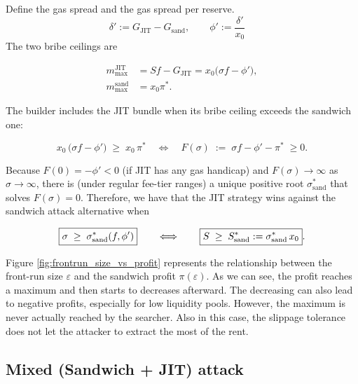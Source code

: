 \documentclass[a4paper,11pt]{article}
\begin{document}

Define the gas spread and the gas spread per reserve.
\begin{equation}
\delta' := G_{\text{JIT}}-G_{\text{sand}},\qquad
\phi'   := \frac{\delta'}{x_{0}}\quad
\end{equation}
The two bribe ceilings are

\[
\begin{aligned}
m_{\max}^{\text{JIT}} 
   &= S f - G_{\text{JIT}} 
   = x_{0} \bigl(\sigma f - \phi' \bigr), \\
m_{\max}^{\text{sand}} 
   &= x_{0} \pi^*.
\end{aligned}
\]

The builder includes the JIT bundle when its
bribe ceiling exceeds the sandwich one:

\begin{equation}
x_{0}\,\bigl(\sigma f - \phi'\bigr)
   \;\ge\;
x_{0}\,\pi^*
\quad\Longleftrightarrow\quad
F(\sigma)\;:=\;
\sigma f - \phi' - \pi^*\;\ge 0.
\end{equation}

Because \(F(0)=-\phi' < 0\) (if JIT has any gas handicap)
and \(F(\sigma)\to \infty\) as \(\sigma\to\infty\),
there is (under regular fee-tier ranges) a unique positive root
\(\sigma_{\text{sand}}^{\ast}\) that solves \(F(\sigma)=0\). Therefore, we have that the JIT strategy wins against the sandwich attack alternative when

\begin{equation}
\boxed{%
   \sigma \;\ge\; \sigma_{\text{sand}}^{\ast}(f,\phi')
}
\qquad\Longleftrightarrow\qquad
\boxed{%
   S      \;\ge\; S_{\text{sand}}^{\ast}:=
            \sigma_{\text{sand}}^{\ast}\,x_{0}
}.
\end{equation}

Figure \ref{fig:frontrun_size_vs_profit} represents the relationship between the front-run size $\varepsilon$ and the sandwich profit $\pi(\varepsilon)$. As we can see, the profit reaches a maximum and then starts to decreases afterward. The decreasing can also lead to negative profits, especially for low liquidity pools. However, the maximum is never actually reached by the searcher. Also in this case, the slippage tolerance does not let the attacker to extract the most of the rent.

\subsection{Mixed (Sandwich + JIT) attack}
\label{subsec:mixed-sandwich-jit}
\end{document}
